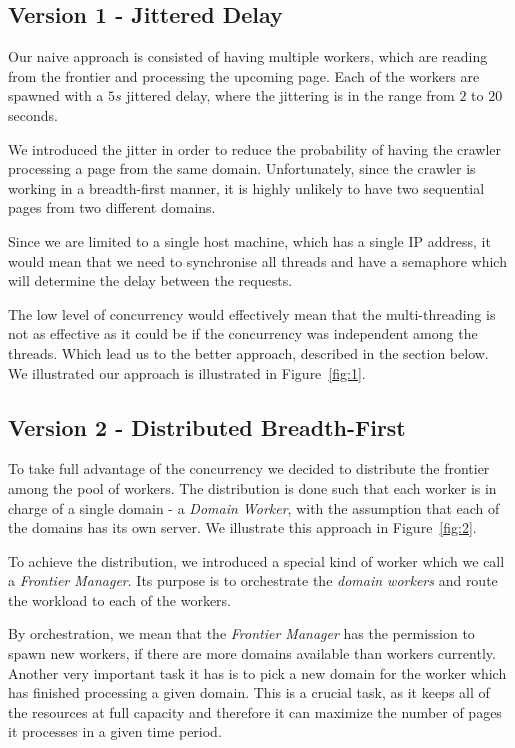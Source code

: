 \documentclass{article}
\begin{document}
\subsection{Version 1 - Jittered Delay} \label{subsec:jitter}

Our naive approach is consisted of having multiple workers, which are reading from the frontier and processing the upcoming page. Each of the workers are spawned with a $5s$ jittered delay, where the jittering is in the range from $2$ to $20$ seconds.

We introduced the jitter in order to reduce the probability of having the crawler processing a page from the same domain. Unfortunately, since the crawler is working in a breadth-first manner, it is highly unlikely to have two sequential pages from two different domains.

Since we are limited to a single host machine, which has a single IP address, it would mean that we need to synchronise all threads and have a semaphore which will determine the delay between the requests.

The low level of concurrency would effectively mean that the multi-threading is not as effective as it could be if the concurrency was independent among the threads. Which lead us to the better approach, described in the section below. We illustrated our approach is illustrated in Figure~\ref{fig:1}.

\subsection{Version 2 - Distributed Breadth-First} \label{subsec:bf}

To take full advantage of the concurrency we decided to distribute the frontier among the pool of workers. The distribution is done such that each worker is in charge of a single domain - a \textit{Domain Worker}, with the assumption that each of the domains has its own server. We illustrate this approach in Figure~\ref{fig:2}.

To achieve the distribution, we introduced a special kind of worker which we call a \textit{Frontier Manager}. Its purpose is to orchestrate the \textit{domain workers} and route the workload to each of the workers. 

By orchestration, we mean that the \textit{Frontier Manager} has the permission to spawn new workers, if there are more domains available than workers currently. Another very important task it has is to pick a new domain for the worker which has finished processing a given domain. This is a crucial task, as it keeps all of the resources at full capacity and therefore it can maximize the number of pages it processes in a given time period.
\end{document}
